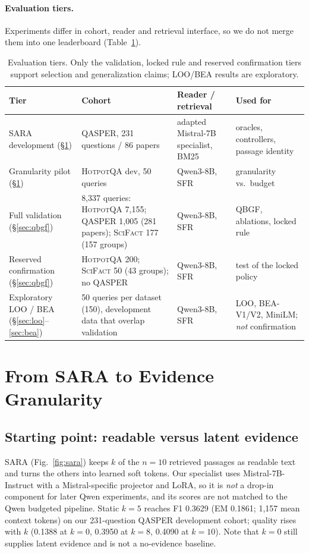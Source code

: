 \documentclass[10pt,twocolumn,letterpaper]{article}
\newcommand{\hotpot}{\textsc{HotpotQA}\xspace}
\newcommand{\qasper}{\textsc{QASPER}\xspace}
\newcommand{\scifact}{\textsc{SciFact}\xspace}
\newcommand{\SmallTable}{\footnotesize\setlength{\tabcolsep}{3.6pt}}
\begin{document}
\paragraph{Evaluation tiers.} Experiments differ in cohort, reader and retrieval interface, so we do not merge them into one leaderboard (Table~\ref{tab:tiers}).

\begin{table}[t]\centering\SmallTable
\caption{Evaluation tiers. Only the validation, locked rule and reserved confirmation tiers support selection and generalization claims; LOO/BEA results are exploratory.}\label{tab:tiers}
\begin{tabularx}{\textwidth}{@{}p{3.15cm}p{5.0cm}p{3.5cm}X@{}}\toprule
Tier & Cohort & Reader / retrieval & Used for\\\midrule
SARA development (\S\ref{sec:evolution}) & \qasper, 231 questions / 86 papers & adapted Mistral-7B specialist, BM25 & oracles, controllers, passage identity\\
Granularity pilot (\S\ref{sec:evolution}) & \hotpot dev, 50 queries & Qwen3-8B, SFR & granularity vs.\ budget\\
Full validation (\S\ref{sec:qbgf}) & 8,337 queries: \hotpot 7,155; \qasper 1,005 (281 papers); \scifact 177 (157 groups) & Qwen3-8B, SFR & QBGF, ablations, locked rule\\
Reserved confirmation (\S\ref{sec:qbgf}) & \hotpot 200; \scifact 50 (43 groups); no \qasper & Qwen3-8B, SFR & test of the locked policy\\
Exploratory LOO / BEA (\S\ref{sec:loo}--\ref{sec:bea}) & 50 queries per dataset (150), development data that overlap validation & Qwen3-8B, SFR & LOO, BEA-V1/V2, MiniLM; \emph{not} confirmation\\\bottomrule
\end{tabularx}\end{table}

\section{From SARA to Evidence Granularity}\label{sec:evolution}
\subsection{Starting point: readable versus latent evidence}
SARA (Fig.~\ref{fig:sara}) keeps $k$ of the $n{=}10$ retrieved passages as readable text and turns the others into learned soft tokens. Our specialist uses Mistral-7B-Instruct with a Mistral-specific projector and LoRA, so it is \emph{not} a drop-in component for later Qwen experiments, and its scores are not matched to the Qwen budgeted pipeline. Static $k{=}5$ reaches F1 0.3629 (EM 0.1861; 1,157 mean context tokens) on our 231-question \qasper development cohort; quality rises with $k$ (0.1388 at $k{=}0$, 0.3950 at $k{=}8$, 0.4090 at $k{=}10$). Note that $k{=}0$ still supplies latent evidence and is not a no-evidence baseline.
\end{document}
